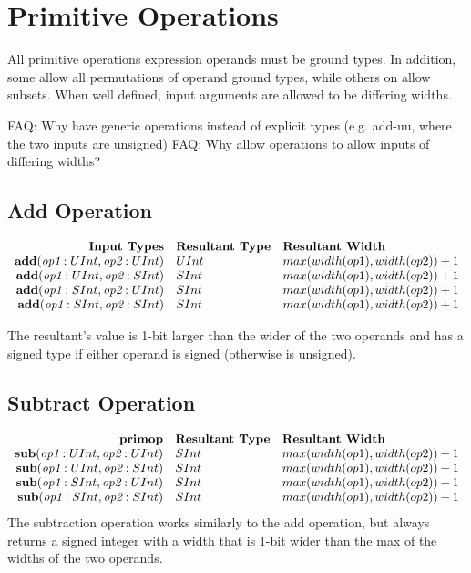 \documentclass[12pt]{article}
\begin{document}
\section{Primitive Operations} \label{primitives}

All primitive operations expression operands must be ground types.
In addition, some allow all permutations of operand ground types, while others on allow subsets.
When well defined, input arguments are allowed to be differing widths.

FAQ: Why have generic operations instead of explicit types (e.g. add-uu, where the two inputs are unsigned)
FAQ: Why allow operations to allow inputs of differing widths?

\subsection{Add Operation}
\[
\begin{array}{rll}
\text{\bf Input Types} & \text{\bf Resultant Type} & \text{\bf Resultant Width} \\
\text{\bf add}(\text{\em op1}:UInt, \text{\em op2}:UInt) & UInt & max(width(op1),width(op2)) + 1 \\
\text{\bf add}(\text{\em op1}:UInt, \text{\em op2}:SInt) & SInt & max(width(op1),width(op2)) + 1 \\
\text{\bf add}(\text{\em op1}:SInt, \text{\em op2}:UInt) & SInt & max(width(op1),width(op2)) + 1 \\
\text{\bf add}(\text{\em op1}:SInt, \text{\em op2}:SInt) & SInt & max(width(op1),width(op2)) + 1 \\
\end{array}
\]

The resultant's value is 1-bit larger than the wider of the two operands and has a signed type if either operand is signed (otherwise is unsigned).

\subsection{Subtract Operation}
\[
\begin{array}{rll}
\text{\bf primop} & \text{\bf Resultant Type} & \text{\bf Resultant Width} \\
\text{\bf sub}(\text{\em op1}:UInt, \text{\em op2}:UInt) &  SInt & max(width(op1),width(op2)) + 1  \\
\text{\bf sub}(\text{\em op1}:UInt, \text{\em op2}:SInt) &  SInt & max(width(op1),width(op2)) + 1  \\
\text{\bf sub}(\text{\em op1}:SInt, \text{\em op2}:UInt) &  SInt & max(width(op1),width(op2)) + 1  \\
\text{\bf sub}(\text{\em op1}:SInt, \text{\em op2}:SInt) &  SInt & max(width(op1),width(op2)) + 1  \\
\end{array}
\]
The subtraction operation works similarly to the add operation, but always returns a signed integer with a width that is 1-bit wider than the max of the widths of the two operands.
\end{document}
